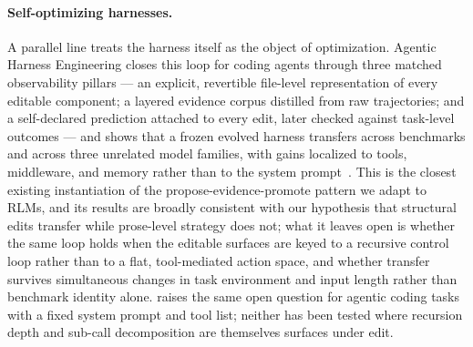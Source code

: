 \documentclass{article}
\begin{document}
\paragraph{Self-optimizing harnesses.}
A parallel line treats the harness itself as the object of optimization. Agentic Harness Engineering closes this loop for coding agents through three matched observability pillars --- an explicit, revertible file-level representation of every editable component; a layered evidence corpus distilled from raw trajectories; and a self-declared prediction attached to every edit, later checked against task-level outcomes --- and shows that a frozen evolved harness transfers across benchmarks and across three unrelated model families, with gains localized to tools, middleware, and memory rather than to the system prompt~\citep{lin2026agenticharness}. This is the closest existing instantiation of the propose-evidence-promote pattern we adapt to RLMs, and its results are broadly consistent with our hypothesis that structural edits transfer while prose-level strategy does not; what it leaves open is whether the same loop holds when the editable surfaces are keyed to a recursive control loop rather than to a flat, tool-mediated action space, and whether transfer survives simultaneous changes in task environment and input length rather than benchmark identity alone. \citet{zhang2026selfharness} raises the same open question for agentic coding tasks with a fixed system prompt and tool list; neither has been tested where recursion depth and sub-call decomposition are themselves surfaces under edit.
\end{document}
